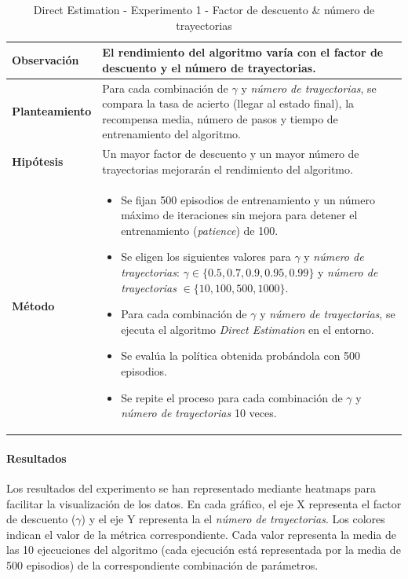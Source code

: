 \begin{table}[H]
    \centering
    \begin{tabularx}{\textwidth}{|p{4cm}|X|} %
        \hline %
        \textbf{Observación} & El rendimiento del algoritmo varía con el factor de descuento y el número de trayectorias.
        \\ \hline
        \textbf{Planteamiento} & Para cada combinación de \(\gamma\) y \textit{número de trayectorias}, se compara la tasa de acierto (llegar al estado final), la recompensa media, número de pasos y tiempo de entrenamiento del algoritmo.
        \\ \hline
        \textbf{Hipótesis} & Un mayor factor de descuento y un mayor número de trayectorias mejorarán el rendimiento del algoritmo.
        \\ \hline
        \textbf{Método} & 
        \begin{itemize}
            \item Se fijan 500 episodios de entrenamiento y un número máximo de iteraciones sin mejora para detener el entrenamiento (\textit{patience}) de 100.
            \item Se eligen los siguientes valores para \(\gamma\) y \textit{número de trayectorias}: \(\gamma \in \{0.5, 0.7, 0.9, 0.95, 0.99\}\) y \textit{número de trayectorias} \(\in \{10, 100, 500, 1000\}\).
            \item Para cada combinación de \(\gamma\) y \textit{número de trayectorias}, se ejecuta el algoritmo \textit{Direct Estimation} en el entorno.
            \item Se evalúa la política obtenida probándola con 500 episodios.
            \item Se repite el proceso para cada combinación de \(\gamma\) y \textit{número de trayectorias} 10 veces.
        \end{itemize}
        \\ \hline
    \end{tabularx}
    \caption{Direct Estimation - Experimento 1 - Factor de descuento \& número de trayectorias}
    \label{tab:diseñoDirectEstimationExp1}
\end{table}

\paragraph{Resultados}

Los resultados del experimento se han representado mediante heatmaps para facilitar la visualización de los datos. En cada gráfico, el eje X representa el factor de descuento ($\gamma$) y el eje Y representa la el \textit{número de trayectorias}. Los colores indican el valor de la métrica correspondiente. Cada valor representa la media de las 10 ejecuciones del algoritmo (cada ejecución está representada por la media de 500 episodios) de la correspondiente combinación de parámetros. 

